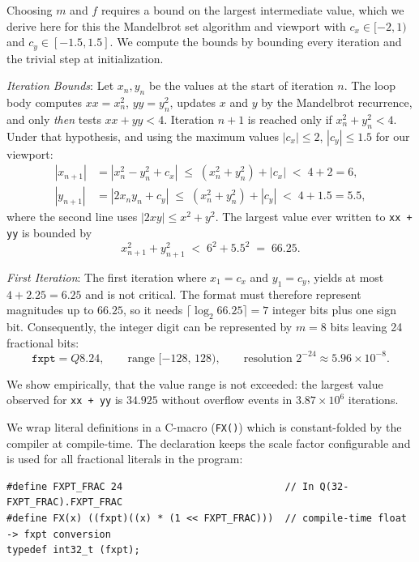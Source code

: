 \documentclass[10pt,a4paper]{article}
\newcommand{\Q}[2]{Q#1.#2}
\begin{document}
Choosing $m$ and $f$ requires a bound on the largest intermediate value, which we derive here for
this the Mandelbrot set algorithm and viewport with $c_x \in [-2,1)$ and $c_y \in [-1.5,1.5]$.
We compute the bounds by bounding every iteration and the trivial step at initialization.

\textit{Iteration Bounds}: Let $x_n, y_n$ be the values at the start of iteration $n$. 
The loop body computes $xx = x_n^2$, $yy = y_n^2$, updates $x$ and $y$ by the Mandelbrot recurrence, and only \emph{then} tests
$xx + yy < 4$. 
Iteration $n+1$ is reached only if $x_n^2 + y_n^2 < 4$. Under that
hypothesis, and using the maximum values $|c_x| \le 2$, $|c_y| \le 1.5$ for our viewport:
\begin{align}
    |x_{n+1}| &= |x_n^2 - y_n^2 + c_x| \;\le\; (x_n^2 + y_n^2) + |c_x| \;<\; 4  + 2 = 6, \\
  |y_{n+1}| &= |2 x_n y_n + c_y|     \;\le\; (x_n^2 + y_n^2) + |c_y| \;<\; 4 + 1.5 = 5.5,
\end{align}
where the second line uses $|2xy| \le x^2 + y^2$. 
The largest value ever written to \texttt{xx + yy} is bounded by
\begin{equation}
  x_{n+1}^2 + y_{n+1}^2 \;<\; 6^2 + 5.5^2 \;=\; 66.25 .
  \label{eq:bound}
\end{equation}

\textit{First Iteration}: The first iteration where $x_1 = c_x$ and $y_1 = c_y$, yields at most $4 + 2.25 = 6.25$ and is
not critical. The format must therefore represent magnitudes up to $66.25$, so it needs
$\lceil \log_2 66.25 \rceil = 7$ integer bits plus one sign bit. Consequently, the integer digit can be represented by $m = 8$ bits leaving 24  fractional bits:
\[
  \boxed{\texttt{fxpt} = \Q{8}{24}, \qquad \text{range } [-128,\,128), \qquad
  \text{resolution } 2^{-24} \approx 5.96 \times 10^{-8}.}
\]

We show empirically, that the value range is not exceeded: the largest value observed for
\texttt{xx + yy} is $34.925$ without overflow events in $3.87 \times 10^6$ iterations.

We wrap literal definitions in a C-macro (\texttt{FX()}) which is constant-folded by the compiler at compile-time. 
The declaration keeps the scale factor configurable and is used for all fractional literals in the program:

\begin{lstlisting}
#define FXPT_FRAC 24                            // In Q(32-FXPT_FRAC).FXPT_FRAC
#define FX(x) ((fxpt)((x) * (1 << FXPT_FRAC)))  // compile-time float -> fxpt conversion
typedef int32_t (fxpt);
\end{lstlisting}
\end{document}
